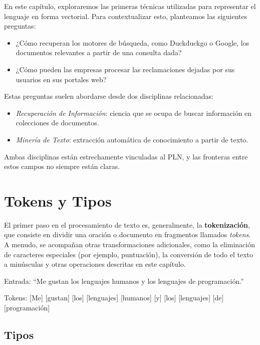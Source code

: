 
En este capítulo, exploraremos las primeras técnicas utilizadas para representar el lenguaje en forma vectorial. Para contextualizar esto, planteamos las siguientes preguntas:

\begin{itemize}
   \item ¿Cómo recuperan los motores de búsqueda, como Duckduckgo o Google, los documentos relevantes a partir de una consulta dada?
   \item ¿Cómo pueden las empresas procesar las reclamaciones dejadas por sus usuarios en sus portales web?
\end{itemize}

Estas preguntas suelen abordarse desde dos disciplinas relacionadas:

\begin{itemize}
   \item \emph{Recuperación de Información}: ciencia que se ocupa de buscar información en colecciones de documentos.
   \item \emph{Minería de Texto}: extracción automática de conocimiento a partir de texto.
\end{itemize}

Ambas disciplinas están estrechamente vinculadas al PLN, y las fronteras entre estos campos no siempre están claras.

\section{Tokens y Tipos}

El primer paso en el procesamiento de texto es, generalmente, la \textbf{tokenización}, que consiste en dividir una oración o documento en fragmentos llamados \emph{tokens}. A menudo, se acompañan otras transformaciones adicionales, como la eliminación de caracteres especiales (por ejemplo, puntuación), la conversión de todo el texto a minúsculas y otras operaciones descritas en este capítulo.

\begin{example}
Entrada: ``Me gustan los lenguajes humanos y los lenguajes de programación.''

Tokens: [Me] [gustan] [los] [lenguajes] [humanos] [y] [los] [lenguajes] [de] [programación] 
\end{example}




\subsection{Tipos}

